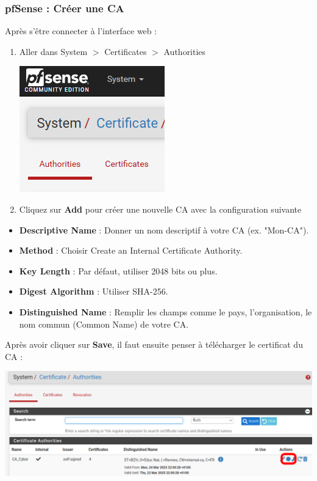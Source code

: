 \documentclass[french, 12pt]{article}%
\newcommand{\itemE}{\item[$\bullet$]}
\begin{document}
\subsubsection{pfSense : Créer une CA}
Après s'être connecter à l'interface web : 

\begin{enumerate}
\item Aller dans System $>$ Certificates $>$ Authorities
\begin{center}
\includegraphics[scale=0.7]{./ressource/caPfsense}
\end{center}

\item Cliquez sur \textbf{Add} pour créer une nouvelle CA avec la configuration suivante

\end{enumerate}
\begin{itemize}
\itemE \textbf{Descriptive Name} : Donner un nom descriptif à votre CA (ex. "Mon-CA").
\itemE \textbf{Method} : Choisir Create an Internal Certificate Authority.
\itemE \textbf{Key Length} : Par défaut, utiliser 2048 bits ou plus.
\itemE \textbf{Digest Algorithm} : Utiliser SHA-256.
\itemE \textbf{Distinguished Name} : Remplir les champs comme le pays, l'organisation, le nom commun (Common Name) de votre CA.

\end{itemize}



Après avoir cliquer sur \textbf{Save}, il faut ensuite penser à télécharger le certificat du CA : 

\begin{center}
\includegraphics[scale=0.5]{./ressource/ca_telecharger}
\end{center}
\end{document}
